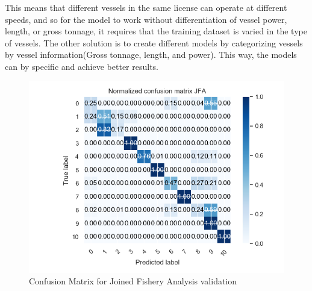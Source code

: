 This means that different vessels in the same license can operate at different speeds, and so for the model to work without differentiation of vessel power, length, or gross tonnage, it requires that the training dataset is varied in the type of vessels.
The other solution is to create different models by categorizing vessels by vessel information(Gross tonnage, length, and power). This way, the models can by specific and achieve better results. 

\begin{figure}[H]
\centering
\includegraphics[width=0.8\linewidth]{Chapters/img/val_JFA.png}
\caption{Confusion Matrix for Joined Fishery Analysis validation }
\label{fig:val_jfa}
\end{figure}





